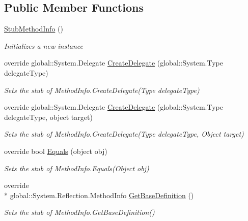 \subsection*{Public Member Functions}
\begin{DoxyCompactItemize}
\item 
\hyperlink{class_system_1_1_reflection_1_1_fakes_1_1_stub_method_info_a8446fda462e4546130493e247fa4549e}{Stub\-Method\-Info} ()
\begin{DoxyCompactList}\small\item\em Initializes a new instance\end{DoxyCompactList}\item 
override global\-::\-System.\-Delegate \hyperlink{class_system_1_1_reflection_1_1_fakes_1_1_stub_method_info_a09f6358dcd04dd2db4da5c5a76e3da65}{Create\-Delegate} (global\-::\-System.\-Type delegate\-Type)
\begin{DoxyCompactList}\small\item\em Sets the stub of Method\-Info.\-Create\-Delegate(\-Type delegate\-Type)\end{DoxyCompactList}\item 
override global\-::\-System.\-Delegate \hyperlink{class_system_1_1_reflection_1_1_fakes_1_1_stub_method_info_a5ed91354fb1106619463538c9b277ffb}{Create\-Delegate} (global\-::\-System.\-Type delegate\-Type, object target)
\begin{DoxyCompactList}\small\item\em Sets the stub of Method\-Info.\-Create\-Delegate(\-Type delegate\-Type, Object target)\end{DoxyCompactList}\item 
override bool \hyperlink{class_system_1_1_reflection_1_1_fakes_1_1_stub_method_info_ae64cdf6ba4a87cf1408bf8586e9210be}{Equals} (object obj)
\begin{DoxyCompactList}\small\item\em Sets the stub of Method\-Info.\-Equals(\-Object obj)\end{DoxyCompactList}\item 
override \\*
global\-::\-System.\-Reflection.\-Method\-Info \hyperlink{class_system_1_1_reflection_1_1_fakes_1_1_stub_method_info_a73ca1f9ea9a3381c0f3675921a852dc3}{Get\-Base\-Definition} ()
\begin{DoxyCompactList}\small\item\em Sets the stub of Method\-Info.\-Get\-Base\-Definition()\end{DoxyCompactList}\item 

\end{DoxyCompactItemize}

